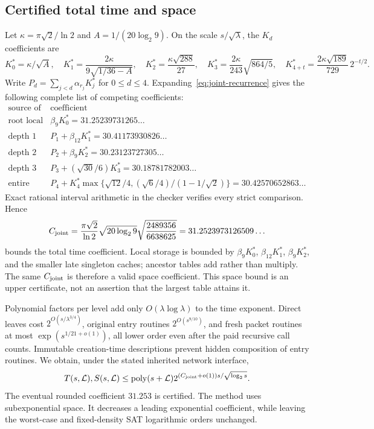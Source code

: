 \subsection{Certified total time and space}
Let $\kappa=\pi\sqrt2/\ln2$ and $A=1/(20\log_2 9)$.  On the scale
$s/\sqrt\lambda$, the $K_d$ coefficients are
\[
 K_0^*=\kappa/\sqrt A,\quad
 K_1^*=\frac{2\kappa}{9\sqrt{1/36-A}},\quad
 K_2^*=\frac{\kappa\sqrt{288}}{27},\quad
 K_3^*=\frac{2\kappa}{243}\sqrt{864/5},\quad
 K_{4+t}^*=\frac{2\kappa\sqrt{189}}{729}\,2^{-t/2}.
\]
Write $P_d=\sum_{j<d}\alpha_{r_j}K_j^*$ for $0\le d\le4$.
Expanding~\eqref{eq:joint-recurrence} gives the following complete list
of competing coefficients:
\[
\begin{array}{c|c}
 \text{source of work}&\text{coefficient}\\\hline
 \text{root local work}&\beta_9K_0^*=31.25239731265\ldots\\
 \text{depth 1 local work}&P_1+\beta_{12}K_1^*=30.41173930826\ldots\\
 \text{depth 2 local work}&P_2+\beta_9K_2^*=30.23123727305\ldots\\
 \text{depth 3 full pair sum}&P_3+(\sqrt{30}/6)K_3^*=30.18781782003\ldots\\
 \text{entire constant-4 tail}&
 P_4+K_4^*\max\{\sqrt{12}/4,(\sqrt6/4)/(1-1/\sqrt2)\}
 =30.42570652863\ldots
\end{array}
\]
Exact rational interval arithmetic in the checker verifies every strict
comparison.  Hence
\begin{equation}\label{eq:joint-headline}
 C_{\rm joint}=
 \frac{\pi\sqrt2}{\ln2}\sqrt{20\log_2 9}
       \sqrt{\frac{2489356}{6638625}}
 =31.2523973126509\ldots
\end{equation}
bounds the total time coefficient.  Local storage is bounded by
$\beta_9K_0^*$, $\beta_{12}K_1^*$, $\beta_9K_2^*$, and the smaller
late singleton caches; ancestor tables add rather than multiply.
The same $C_{\rm joint}$ is therefore a valid space coefficient.
This space bound is an upper certificate, not an assertion that the
largest table attains it.

Polynomial factors per level add only $O(\lambda\log\lambda)$ to the
time exponent.  Direct leaves cost $2^{O(s/\lambda^{3/4})}$, original
entry routines $2^{O(s^{9/10})}$, and fresh packet routines at most
$\exp(s^{1/21+o(1)})$, all lower order even after the paid recursive
call counts.  Immutable creation-time descriptions prevent hidden
composition of entry routines.  We obtain, under the stated inherited
network interface,
\[
 T(s,\mathcal L),S(s,\mathcal L)
 \le\operatorname{poly}(s+\mathcal L)
       2^{(C_{\rm joint}+o(1))s/\sqrt{\log_2s}}.
\]
The eventual rounded coefficient $31.253$ is certified.  The method uses
subexponential space.  It decreases a leading exponential coefficient,
while leaving the worst-case and fixed-density SAT logarithmic orders
unchanged.

